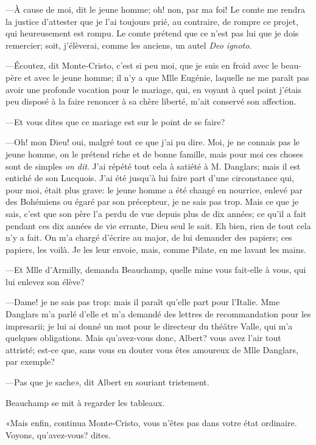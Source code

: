 —À cause de moi, dit le jeune homme; oh! non, par ma foi! Le comte me rendra la justice d'attester que je l'ai toujours prié, au contraire, de rompre ce projet, qui heureusement est rompu. Le comte prétend que ce n'est pas lui que je dois remercier; soit, j'élèverai, comme les anciens, un autel \textit{Deo ignoto}. 

—Écoutez, dit Monte-Cristo, c'est si peu moi, que je suis en froid avec le beau-père et avec le jeune homme; il n'y a que Mlle Eugénie, laquelle ne me paraît pas avoir une profonde vocation pour le mariage, qui, en voyant à quel point j'étais peu disposé à la faire renoncer à sa chère liberté, m'ait conservé son affection. 

—Et vous dites que ce mariage est sur le point de se faire? 

—Oh! mon Dieu! oui, malgré tout ce que j'ai pu dire. Moi, je ne connais pas le jeune homme, on le prétend riche et de bonne famille, mais pour moi ces choses sont de simples \textit{on dit}. J'ai répété tout cela à satiété à M. Danglars; mais il est entiché de son Lucquois. J'ai été jusqu'à lui faire part d'une circonstance qui, pour moi, était plus grave: le jeune homme a été changé en nourrice, enlevé par des Bohémiens ou égaré par son précepteur, je ne sais pas trop. Mais ce que je sais, c'est que son père l'a perdu de vue depuis plus de dix années; ce qu'il a fait pendant ces dix années de vie errante, Dieu seul le sait. Eh bien, rien de tout cela n'y a fait. On m'a chargé d'écrire au major, de lui demander des papiers; ces papiers, les voilà. Je les leur envoie, mais, comme Pilate, en me lavant les mains. 

—Et Mlle d'Armilly, demanda Beauchamp, quelle mine vous fait-elle à vous, qui lui enlevez son élève? 

—Dame! je ne sais pas trop: mais il paraît qu'elle part pour l'Italie. Mme Danglars m'a parlé d'elle et m'a demandé des lettres de recommandation pour les impresarii; je lui ai donné un mot pour le directeur du théâtre Valle, qui m'a quelques obligations. Mais qu'avez-vous donc, Albert? vous avez l'air tout attristé; est-ce que, sans vous en douter vous êtes amoureux de Mlle Danglars, par exemple? 

—Pas que je sache», dit Albert en souriant tristement. 

Beauchamp se mit à regarder les tableaux. 

«Mais enfin, continua Monte-Cristo, vous n'êtes pas dans votre état ordinaire. Voyons, qu'avez-vous? dites. 

